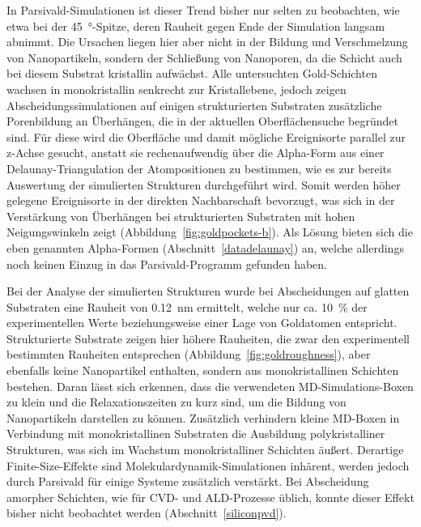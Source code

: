 In Parsivald-Simulationen ist dieser Trend bisher nur selten zu beobachten, wie etwa bei der \SI{45}{\degree}-Spitze, deren Rauheit gegen Ende der Simulation langsam abnimmt.
Die Ursachen liegen hier aber nicht in der Bildung und Verschmelzung von Nanopartikeln, sondern der Schließung von Nanoporen, da die Schicht auch bei diesem Substrat kristallin aufwächst.
Alle untersuchten Gold-Schichten wachsen in monokristallin senkrecht zur Kristallebene, jedoch zeigen Abscheidungssimulationen auf einigen strukturierten Substraten zusätzliche Porenbildung an Überhängen, die in der aktuellen Oberflächensuche begründet sind.
Für diese wird die Oberfläche und damit mögliche Ereignisorte parallel zur z-Achse gesucht, anstatt sie rechenaufwendig über die Alpha-Form aus einer Delaunay-Triangulation der Atompositionen zu bestimmen, wie es zur bereits Auswertung der simulierten Strukturen durchgeführt wird.
Somit werden höher gelegene Ereignisorte in der direkten Nachbarschaft bevorzugt, was sich in der Verstärkung von Überhängen bei strukturierten Substraten mit hohen Neigungswinkeln zeigt (Abbildung~\ref{fig:goldpockets-b}).
Als Lösung bieten sich die eben genannten Alpha-Formen (Abschnitt~\ref{datadelaunay}) an, welche allerdings noch keinen Einzug in das Parsivald-Programm gefunden haben.

Bei der Analyse der simulierten Strukturen wurde bei Abscheidungen auf glatten Substraten eine Rauheit von \SI{0.12}{\nano\meter} ermittelt, welche nur ca. \SI{10}{\percent} der experimentellen Werte beziehungsweise einer Lage von Goldatomen entspricht.
Strukturierte Substrate zeigen hier höhere Rauheiten, die zwar den experimentell bestimmten Rauheiten entsprechen (Abbildung~\ref{fig:goldroughness}), aber ebenfalls keine Nanopartikel enthalten, sondern aus monokristallinen Schichten bestehen.
Daran lässt sich erkennen, dass die verwendeten MD-Simulations-Boxen zu klein und die Relaxationszeiten zu kurz sind, um die Bildung von Nanopartikeln darstellen zu können.
Zusätzlich verhindern kleine MD-Boxen in Verbindung mit monokristallinen Substraten die Ausbildung polykristalliner Strukturen, was sich im Wachstum monokristalliner Schichten äußert.
Derartige Finite-Size-Effekte sind Molekulardynamik-Simulationen inhärent, werden jedoch durch Parsivald für einige Systeme zusätzlich verstärkt.
Bei Abscheidung amorpher Schichten, wie für CVD- und ALD-Prozesse üblich, konnte dieser Effekt bisher nicht beobachtet werden (Abschnitt~\ref{siliconpvd}).

